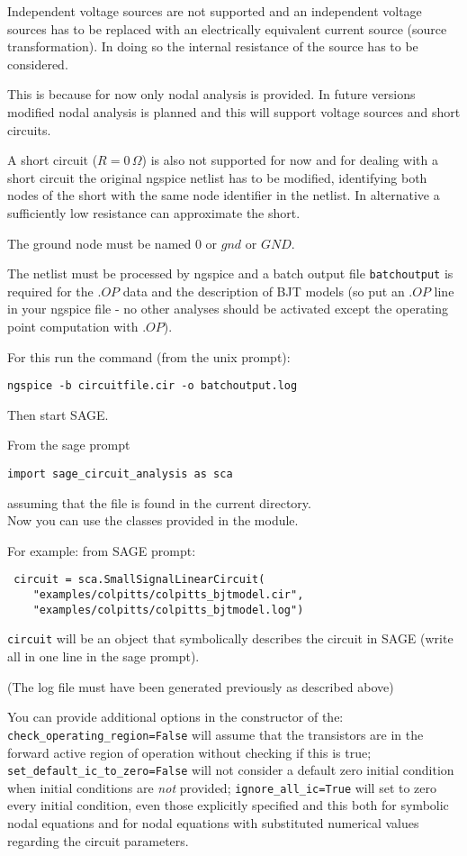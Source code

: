 \documentclass[a4paper]{article}
\begin{document}
Independent voltage sources are not supported and an independent voltage sources has to be replaced with an electrically equivalent current source (source transformation). In doing so the internal resistance of the source has to be considered.

This is because for now only nodal analysis is provided. In future versions modified nodal analysis is planned and this will support voltage sources and short circuits.

A short circuit ($R=0\,\Omega$) is also not supported for now and for dealing with a short circuit the original ngspice netlist has to be modified, identifying both nodes of the short with the same node identifier in the netlist. In alternative a sufficiently low resistance can approximate the short.

The ground node must be named $0$ or $gnd$ or $GND$.

The netlist must be processed by ngspice and a batch output file {\tt batchoutput} is required for the $.OP$ data and the description of BJT models (so put an $.OP$ line in your ngspice file - no other analyses should be activated except the operating point computation with $.OP$). 

For this run the command (from the unix prompt):
\begin{verbatim}
ngspice -b circuitfile.cir -o batchoutput.log
\end{verbatim}

Then start SAGE.

From the sage prompt 
\begin{verbatim}
import sage_circuit_analysis as sca
\end{verbatim}
assuming that the file is found in the current directory.\\

Now you can use the classes provided in the module.

For example: from SAGE prompt:
\begin{verbatim}
 circuit = sca.SmallSignalLinearCircuit(
 	"examples/colpitts/colpitts_bjtmodel.cir", 
	"examples/colpitts/colpitts_bjtmodel.log")
\end{verbatim}
{\tt circuit} will be an object that symbolically describes the circuit in SAGE (write all in one line in the sage prompt).

(The log file must have been generated previously as described above)

You can provide additional options in the constructor of the: {\tt check\_operating\_region=False} will assume that the transistors are in the forward active region of operation without checking if this is true; {\tt set\_default\_ic\_to\_zero=False} will not consider a default zero initial condition when initial conditions are \emph{not} provided; {\tt ignore\_all\_ic=True} will set to zero every initial condition, even those explicitly specified and this both for symbolic nodal equations and for nodal equations with substituted numerical values regarding the circuit parameters.
\end{document}
